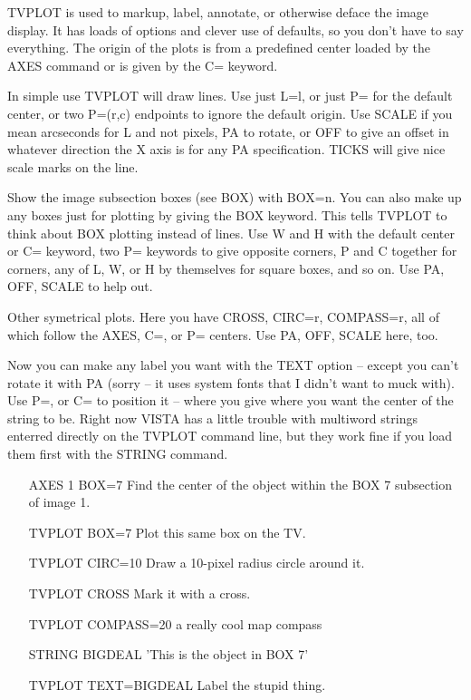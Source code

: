 TVPLOT is used to markup, label, annotate, or otherwise deface the image
display.  It has loads of options and clever use of defaults, so you don't
have to say everything.  The origin of the plots is from a predefined
center loaded by the AXES command or is given by the C= keyword.

In simple use TVPLOT will draw lines.  Use just L=l, or just P= for the
default center, or two P=(r,c) endpoints to ignore the default origin.  Use
SCALE if you mean arcseconds for L and not pixels, PA to rotate, or OFF to
give an offset in whatever direction the X axis is for any PA
specification.  TICKS will give nice scale marks on the line.

Show the image subsection boxes (see BOX) with BOX=n.  You can also make up
any boxes just for plotting by giving the BOX keyword.  This tells TVPLOT
to think about BOX plotting instead of lines.  Use W and H with the default
center or C= keyword, two P= keywords to give opposite corners, P and C
together for corners, any of L, W, or H by themselves for square boxes, and
so on.  Use PA, OFF, SCALE to help out.

Other symetrical plots.  Here you have CROSS, CIRC=r, COMPASS=r, all of
which follow the AXES, C=, or P= centers. Use PA, OFF, SCALE here, too.

Now you can make any label you want with the TEXT option -- except you can't
rotate it with PA (sorry -- it uses system fonts that I didn't want to muck
with).  Use P=, or C= to position it -- where you give where you want the
center of the string to be.  Right now VISTA has a little trouble with
multiword strings enterred directly on the TVPLOT command line, but they
work fine if you load them first with the STRING command.

\begin{itemize}
  \item[AXES 1 BOX=7\hfill]{Find the center of the object within
       the BOX 7 subsection of image 1.}
  \item[TVPLOT BOX=7\hfill]{Plot this same box on the TV.}
  \item[TVPLOT CIRC=10\hfill]{Draw a 10-pixel radius circle around it.}
  \item[TVPLOT CROSS\hfill]{Mark it with a cross.}
  \item[TVPLOT COMPASS=20\hfill]{a really cool map compass}
  \item[STRING BIGDEAL  'This is the object in BOX 7']{}
  \item[TVPLOT TEXT=BIGDEAL\hfill]{Label the stupid thing.}
\end{itemize}

